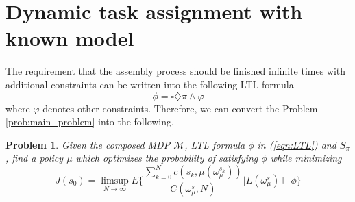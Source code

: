 \documentclass[journal]{IEEEtran}
\newtheorem{problem}{Problem}
\begin{document}
%		
%		
%		
%		
%		
%		
%		






\section{Dynamic task assignment with known model}\label{sec:main_results}
The requirement that the assembly process should be finished infinite times with additional constraints can be written into the following LTL formula
\begin{equation}\label{eqn:LTL}
	\phi=\square\diamondsuit\pi\wedge\varphi
\end{equation}
where $\varphi$ denotes other constraints. Therefore, we can convert the Problem \ref{prob:main_problem} into the following.
\begin{problem}\label{prob:LTL_problem}
	Given the composed MDP $\mathcal{M}$, LTL formula $\phi$ in (\ref{eqn:LTL}) and $S_\pi$, find a policy $\mu$ which optimizes the probability of satisfying $\phi$ while minimizing
	\begin{equation}\label{eqn:optimalltl}
		J(s_0)=\limsup_{N\rightarrow\infty}E\{\frac{\sum_{k=0}^{N}c(s_k,\mu(\omega_\mu^{s_k}))}{C(\omega_\mu^s,N)}|L(\omega_\mu^s)\models\phi\}
	\end{equation} 
\end{problem}
\end{document}
